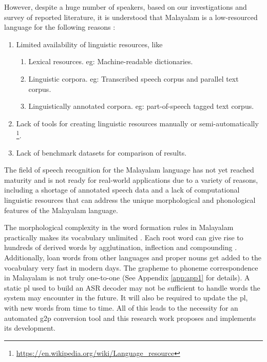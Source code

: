 However, despite a huge number of speakers, based on our investigations and survey of reported literature, it is understood that Malayalam is a low-resourced language for the  following reasons \cite{besacier2014automatic}:

\begin{enumerate}
    \item Limited  availability of  linguistic resources, like
    \begin{enumerate}
        \item Lexical resources. eg: Machine-readable dictionaries.
        \item Linguistic corpora. eg: Transcribed speech corpus \cite{bhogale2023effectiveness} and parallel text corpus.
        \item Linguistically annotated corpora. eg: part-of-speech tagged text corpus.
    \end{enumerate}
    \item Lack of tools for creating linguistic resources manually or semi-automatically \footnote{\url{https://en.wikipedia.org/wiki/Language_resource}}.
    \item Lack of benchmark datasets for comparison of results.
\end{enumerate}




The field of speech recognition for the Malayalam language has not yet reached maturity and is not ready for real-world applications due to a variety of reasons, including
a shortage of annotated speech data and a lack of computational linguistic resources that can address the unique morphological and phonological features of the Malayalam language.


The morphological complexity in the word formation rules in Malayalam practically makes its vocabulary unlimited \cite{bharadwaja2007statistical}. Each root word can give rise to hundreds of derived words by agglutination, inflection and compounding \cite{thottingal2019finite}. Additionally, loan words  from other languages and proper nouns get added to the
vocabulary very fast in modern days. 
The grapheme to phoneme correspondence in Malayalam is not truly
one-to-one (See Appendix \ref{app:app1} for details). A static \gls{pl} used to build an ASR decoder may not be sufficient to handle words the system may encounter in the future. It will also be required to update the \gls{pl}, with new words from time to time. All of this leads to the necessity for an automated \gls{g2p} conversion tool and this research work proposes and implements its development.


